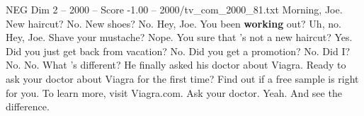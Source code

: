 \begin{textsample}{NEG Dim 2 – 2000 – Score -1.00 – 2000/tv\_com\_2000\_81.txt}  \label{ex:f2_neg_012}
Morning, Joe.
New haircut?
No.
New shoes?
No.
Hey, Joe.
You been \textbf{working} out?
Uh, no.
Hey, Joe.
Shave your mustache?
Nope.
You sure that 's not a new haircut?
Yes.
Did you just get back from vacation?
No.
Did you get a promotion?
No.
Did I?
No.
No.
What 's different?
He finally asked his doctor about Viagra.
Ready to ask your doctor about Viagra for the first time?
Find out if a free sample is right for you.
To learn more, visit Viagra.com.
Ask your doctor.
Yeah.
And see the difference.

\end{textsample}
